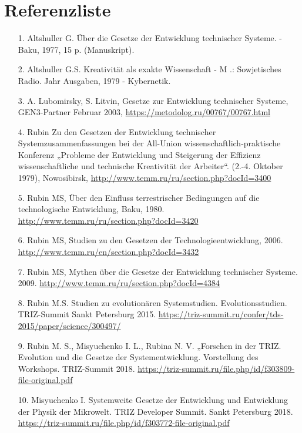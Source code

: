 \documentclass[11pt,a4paper]{article}
\begin{document}
\section*{Referenzliste}
\begin{itemize}
\item[1.] Altshuller G. Über die Gesetze der Entwicklung technischer
  Systeme. - Baku, 1977, 15 p.  (Manuskript).
\item[2.] Altshuller G.S. Kreativität als exakte Wissenschaft - M .:
  Sowjetisches Radio. Jahr Ausgaben, 1979 - Kybernetik.
\item[3.] A. Lubomirsky, S. Litvin, Gesetze zur Entwicklung technischer
  Systeme, GEN3-Partner Februar 2003,
  \url{https://metodolog.ru/00767/00767.html} 
\item[4.] Rubin Zu den Gesetzen der Entwicklung technischer
  Systemzusammenfassungen bei der All-Union wissenschaftlich-praktische
  Konferenz „Probleme der Entwicklung und Steigerung der Effizienz
  wissenschaftliche und technische Kreativität der Arbeiter“. (2.-4. Oktober
  1979), Nowosibirsk, \url{http://www.temm.ru/ru/section.php?docId=3400}
\item[5.] Rubin MS, Über den Einfluss terrestrischer Bedingungen auf die
  technologische Entwicklung, Baku, 1980.
  \url{http://www.temm.ru/ru/section.php?docId=3420}
\item[6.] Rubin MS, Studien zu den Gesetzen der Technologieentwicklung, 2006.
  \url{http://www.temm.ru/en/section.php?docId=3432}
\item[7.] Rubin MS, Mythen über die Gesetze der Entwicklung technischer
  Systeme. 2009.  \url{http://www.temm.ru/ru/section.php?docId=4384}
\item[8.] Rubin M.S. Studien zu evolutionären
  Systemstudien. Evolutionsstudien. TRIZ-Summit Sankt Petersburg 2015.
  \url{https://triz-summit.ru/confer/tds-2015/paper/science/300497/}
\item[9.] Rubin M. S., Misyuchenko I. L., Rubina N. V. „Forschen in der TRIZ.
  Evolution und die Gesetze der Systementwicklung. Vorstellung des
  Workshops. TRIZ-Summit 2018.
  \url{https://triz-summit.ru/file.php/id/f303809-file-original.pdf}
\item[10.] Misyuchenko I. Systemweite Gesetze der Entwicklung und Entwicklung
  der Physik der Mikrowelt.  TRIZ Developer Summit.  Sankt Petersburg 2018.
  \url{https://triz-summit.ru/file.php/id/f303772-file-original.pdf}
\end{itemize}
\end{document}
